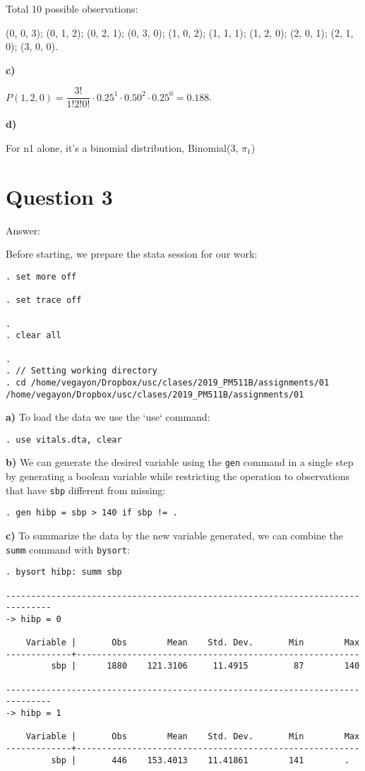 \documentclass{article}
\begin{document}
Total 10 possible observations: \par
(0, 0, 3); (0, 1, 2); (0, 2, 1); (0, 3, 0); (1, 0, 2); (1, 1, 1); (1, 2, 0); (2, 0, 1); (2, 1, 0); (3, 0, 0).

\textbf{c)}

$P(1, 2, 0)=\dfrac{3!}{1! 2! 0!}\cdot 0.25^1 \cdot 0.50^2 \cdot 0.25^0 = 0.188$.

\textbf{d)}

For n1 alone, it's a binomial distribution, Binomial(3, $\pi_1$)

\section*{Question 3}

Answer:

Before starting, we prepare the stata session for our work:

\begin{verbatim}
. set more off

. set trace off

. 
. clear all

. 
. // Setting working directory
. cd /home/vegayon/Dropbox/usc/clases/2019_PM511B/assignments/01
/home/vegayon/Dropbox/usc/clases/2019_PM511B/assignments/01
\end{verbatim}

\textbf{a)} To load the data we use the `use` command:

\begin{verbatim}
. use vitals.dta, clear

\end{verbatim}

\textbf{b)} We can generate the desired variable using the \texttt{gen} command in a single step by generating a boolean variable while restricting the operation to observations that have \texttt{sbp} different from missing:

\begin{verbatim}
. gen hibp = sbp > 140 if sbp != .
\end{verbatim}

\textbf{c)} To summarize the data by the new variable generated, we can combine the \texttt{summ} command with \texttt{bysort}:

\begin{verbatim}
. bysort hibp: summ sbp

-------------------------------------------------------------------------------
-> hibp = 0

    Variable |       Obs        Mean    Std. Dev.       Min        Max
-------------+--------------------------------------------------------
         sbp |      1880    121.3106     11.4915         87        140

-------------------------------------------------------------------------------
-> hibp = 1

    Variable |       Obs        Mean    Std. Dev.       Min        Max
-------------+--------------------------------------------------------
         sbp |       446    153.4013    11.41861        141        . 
\end{verbatim}
\end{document}
